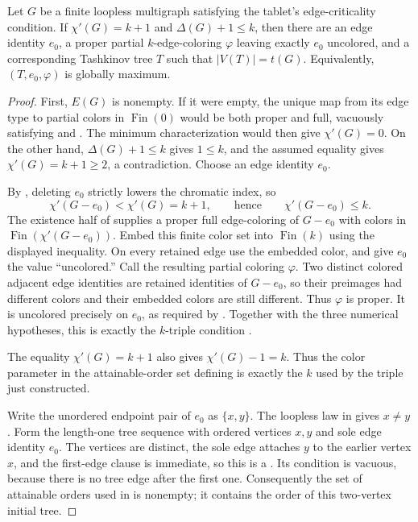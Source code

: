 \begin{lemma}
Let $G$ be a finite loopless multigraph satisfying the tablet's
edge-criticality condition.  If $\chi'(G)=k+1$ and
$\Delta(G)+1\leq k$, then there are an edge identity $e_0$, a proper
partial $k$-edge-coloring $\varphi$ leaving exactly $e_0$ uncolored, and a
corresponding Tashkinov tree $T$ such that
$|V(T)|=t(G)$.  Equivalently, $(T,e_0,\varphi)$ is globally maximum.
\end{lemma}
\begin{proof}
First, $E(G)$ is nonempty.  If it were empty, the unique map from its edge
type to partial colors in $\operatorname{Fin}(0)$ would be both proper and
full, vacuously satisfying  and
.  The minimum characterization
 would then give $\chi'(G)=0$.  On the other
hand, $\Delta(G)+1\leq k$ gives $1\leq k$, and the assumed equality gives
$\chi'(G)=k+1\geq2$, a contradiction.  Choose an edge identity $e_0$.

By , deleting $e_0$ strictly lowers the chromatic index,
so
\[
 \chi'(G-e_0)<\chi'(G)=k+1,
 \qquad\text{hence}\qquad \chi'(G-e_0)\leq k.
\]
The existence half of  supplies a proper full
edge-coloring of $G-e_0$ with colors in
$\operatorname{Fin}(\chi'(G-e_0))$.  Embed this finite color set into
$\operatorname{Fin}(k)$ using the displayed inequality.  On every retained
edge use the embedded color, and give $e_0$ the value ``uncolored.''
Call the resulting partial coloring $\varphi$.  Two distinct colored
adjacent edge identities are retained identities of $G-e_0$, so their
preimages had different colors and their embedded colors are still
different.  Thus $\varphi$ is proper.  It is uncolored precisely on $e_0$,
as required by .  Together with the three
numerical hypotheses, this is exactly the $k$-triple condition
.

The equality $\chi'(G)=k+1$ also gives $\chi'(G)-1=k$.  Thus the color
parameter in the attainable-order set defining 
is exactly the $k$ used by the triple just constructed.

Write the unordered endpoint pair of $e_0$ as $\{x,y\}$.  The loopless law
in  gives $x\ne y$.  Form the length-one tree
sequence with ordered vertices $x,y$ and sole edge identity $e_0$.  The
vertices are distinct, the sole edge attaches $y$ to the earlier vertex
$x$, and the first-edge clause is immediate, so this is a
.  Its  condition is vacuous,
because there is no tree edge after the first one.  Consequently the set
of attainable orders used in  is nonempty; it
contains the order of this two-vertex initial tree.


\end{proof}
